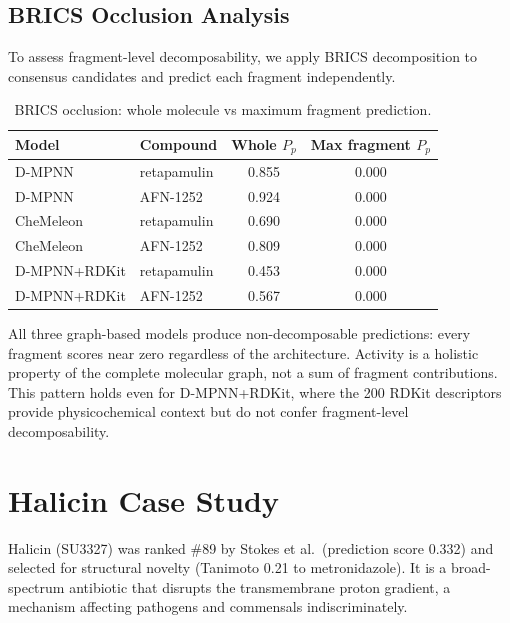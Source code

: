 \documentclass{article}
\begin{document}
\subsection{BRICS Occlusion Analysis}

To assess fragment-level decomposability, we apply BRICS decomposition to consensus candidates and predict each fragment independently.

\begin{table}[ht]
\caption{BRICS occlusion: whole molecule vs maximum fragment prediction.}
\label{tab:occlusion}
\centering
\scriptsize
\begin{tabular}{llcc}
\toprule
\textbf{Model} & \textbf{Compound} & \textbf{Whole $P_p$} & \textbf{Max fragment $P_p$} \\
\midrule
D-MPNN & retapamulin & 0.855 & 0.000 \\
D-MPNN & AFN-1252 & 0.924 & 0.000 \\
CheMeleon & retapamulin & 0.690 & 0.000 \\
CheMeleon & AFN-1252 & 0.809 & 0.000 \\
D-MPNN+RDKit & retapamulin & 0.453 & 0.000 \\
D-MPNN+RDKit & AFN-1252 & 0.567 & 0.000 \\
\bottomrule
\end{tabular}
\end{table}

All three graph-based models produce non-decomposable predictions: every fragment scores near zero regardless of the architecture.
Activity is a holistic property of the complete molecular graph, not a sum of fragment contributions.
This pattern holds even for D-MPNN+RDKit, where the 200 RDKit descriptors provide physicochemical context but do not confer fragment-level decomposability.


\section{Halicin Case Study}
\label{app:halicin}

Halicin (SU3327) was ranked \#89 by Stokes et al.\ (prediction score 0.332) and selected for structural novelty (Tanimoto 0.21 to metronidazole).
It is a broad-spectrum antibiotic that disrupts the transmembrane proton gradient, a mechanism affecting pathogens and commensals indiscriminately.
\end{document}
